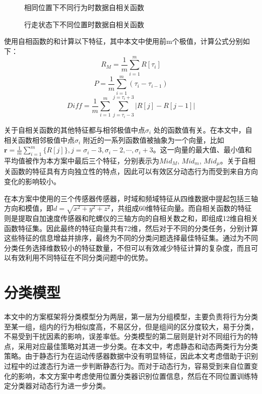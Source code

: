 \begin{figure}[!htb]
    \centering
    \caption{相同位置下不同行为时数据自相关函数}
\end{figure}

\begin{figure}[!htb]
    \centering
    \caption{行走状态下不同位置时数据自相关函数}
\end{figure}

\par 使用自相函数的和计算以下特征，其中本文中使用前m个极值，计算公式分别如下：
\begin{equation}
    R_M = \frac {1}{m}\sum_{i=1}^m R[\tau_i]
\end{equation}
\begin{equation}
    P = \frac{1}{m}\sum_{i=1}^m {(\tau_i-\tau_{i-1})}
\end{equation}
\begin{equation}
    Diff = \frac{1}{m}\sum_{i=1}^m \sum_{j=\tau_i-3}^{j=\tau_i+3} {|R[j]-R[j-1]|} 
\end{equation}
\par 关于自相关函数的其他特征都与相邻极值中点$\sigma_i$ 处的函数值有关。在本文中，自相关函数相邻极值中点$\sigma_i$ 附近的一系列函数值被抽象为一个向量，比如 $\textbf{r}=\frac {1}{m} \sum_{i=1}^m\{R[j]\}, j=\sigma_i-3, \sigma_i-2,\cdots,\sigma_i+3$。这一向量的最大值、最小值和平均值被作为本方案中最后三个特征，分别表示为$Mid_M$, $Mid_m$, $Mid_\mu$。关于自相关函数的特征具有方向独立性的特点，因此可以有效区分动态行为而受到来自方向变化的影响较小。
\par 在本方案中使用的三个传感器传感器，时域和频域特征从四维数据中提起包括三轴方向和模值，即$d=\sqrt{x^2+y^2+z^2}$，共组成60维特征向量。而自相关函数的特征则是提取自加速度传感器和陀螺仪的三轴方向的自相关数之和，即组成12维自相关函数特征集。因此最终的特征向量共有72维，然后对于不同的分类任务，分别计算这些特征的信息增益并排序，最终为不同的分类问题选择最佳特征集。通过为不同分类任务选择维数较小的特征数量，不但可以有效减少特征计算的复杂度，而且可以有效利用不同特征在不同分类问题中的优势。

\section{分类模型}
\par 本文中的方案框架将分类模型分为两层，第一层为分组模型，主要负责将行为分类至某一组，组内的行为相似度高，不易区分，但是组间的区分度较大，易于分类，不易受到干扰因素的影响，误差率低。分类模型的第二层则是针对不同组行为的特点，采用对应最佳策略对其进一步分类。在本文中，考虑静态和动态两类行为分类策略。由于静态行为在运动传感器数据中没有明显特征，因此本文考虑借助于识别过程中的过渡态行为进一步判断静态行为。而对于动态行为，容易受到来自位置变化的影响，本文方案中考虑使用位置分类器识别位置信息，然后在不同位置训练特定分类器对动态行为进一步分类。
